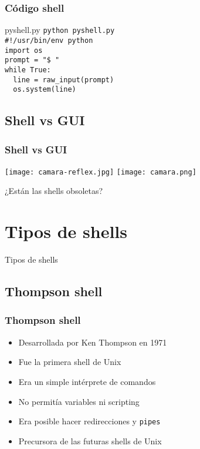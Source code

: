 \documentclass{beamer}
\begin{document}
\begin{frame}
  \frametitle{Código shell}

  \begin{block}{pyshell.py}
    \small{\texttt{python pyshell.py}}\\
    \medskip
    \small{\texttt{\#!/usr/bin/env python\\
    \medskip
    import os\\
    \medskip
    prompt = "\$ "\\
    \medskip
    while True:\\
    \ \ line = raw\_input(prompt)\\
    \ \ os.system(line)}}
  \end{block}
\end{frame}

\subsection{Shell vs GUI}

\begin{frame}
  \frametitle{Shell vs GUI}
    \texttt{[image: camara-reflex.jpg]}
    \texttt{[image: camara.png]}
  \begin{center}
    \huge{¿Están las shells obsoletas?}
  \end{center}
\end{frame}


\section{Tipos de shells}
\begin{frame}
  \begin{center}
    \huge{Tipos de shells}
  \end{center}
\end{frame}

\subsection{Thompson shell}

\begin{frame}
  \frametitle{Thompson shell}
  \begin{itemize}
    \item Desarrollada por Ken Thompson en 1971
    \item Fue la primera shell de Unix
    \medskip
    \item Era un simple intérprete de comandos
    \item No permitía variables ni scripting
    \medskip
    \item Era posible hacer redirecciones y \texttt{pipes}
    \medskip
    \item Precursora de las futuras shells de Unix
  \end{itemize}
\end{frame}
\end{document}
